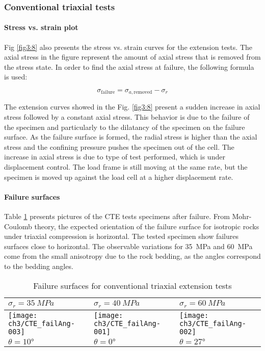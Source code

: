 \subsubsection{Conventional triaxial tests}

\paragraph{Stress vs. strain plot}

Fig \ref{fig3:8} also presents the stress vs. strain curves for the extension tests. The axial stress in the figure represent the amount of axial stress that is removed from the stress state. In order to find the axial stress at failure, the following formula is used: 

\begin{equation}
    \sigma_\text{failure} = \sigma_{a,\text{removed}} - \sigma_r
\end{equation}

The extension curves showed in the Fig. \ref{fig3:8} present a sudden increase in axial stress followed by a constant axial stress. This behavior is due to the failure of the specimen and particularly to the dilatancy of the specimen on the failure surface. As the failure surface is formed, the radial stress is higher than the axial stress and the confining pressure pushes the specimen out of the cell. The increase in axial stress is due to type of test performed, which is under displacement control. The load frame is still moving at the same rate, but the specimen is moved up against the load cell at a higher displacement rate. 

\paragraph{Failure surfaces}

Table \ref{tb3:photoCTE} presents pictures of the CTE tests specimens after failure. From Mohr-Coulomb theory, the expected orientation of the failure surface for isotropic rocks under triaxial compression is horizontal. The tested specimen show failures surfaces close to horizontal. The observable variations for \SI{35}{MPa} and \SI{60}{MPa} come from the small anisotropy due to the rock bedding, as the angles correspond to the bedding angles.  

\begin{table}
    \centering
    \begin{tabular}{|l|l|l|}
     \hline
     $\sigma_r = \SI{35}{MPa}$ & $\sigma_r = \SI{40}{MPa}$ &  $\sigma_r = \SI{60}{MPa}$ \\
     \hline
     \texttt{[image: ch3/CTE\_failAng-003]} & 
     \texttt{[image: ch3/CTE\_failAng-001]} &
     \texttt{[image: ch3/CTE\_failAng-002]} \\
     \hline
     $\theta = \ang{10}$ & $\theta = \ang{0}$  &  $\theta = \ang{27}$ \\
     \hline
    \end{tabular}
    \caption{Failure surfaces for conventional triaxial extension tests}
    \label{tb3:photoCTE}
\end{table}


